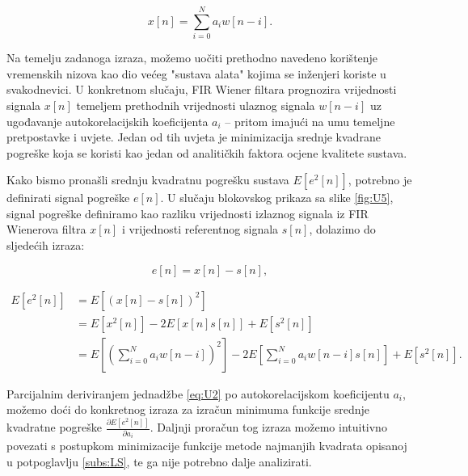 \documentclass[a4paper,12pt,oneside]{memoir}
\begin{document}
            \begin{equation}
                x[n]=\displaystyle\sum_{i=0}^{N}a_i w[n-i].
            \end{equation}

            Na temelju zadanoga izraza, možemo uočiti prethodno navedeno korištenje vremenskih nizova kao dio većeg "sustava alata" kojima se inženjeri koriste u svakodnevici. U konkretnom slučaju, FIR Wiener filtara prognozira vrijednosti signala $x[n]$ temeljem prethodnih vrijednosti ulaznog signala $w[n-i]$ uz ugođavanje autokorelacijskih koeficijenta $a_i$ -- pritom imajući na umu temeljne pretpostavke i uvjete. Jedan od tih uvjeta je minimizacija srednje kvadrane pogreške koja se koristi kao jedan od analitičkih faktora ocjene kvalitete sustava.

            Kako bismo pronašli srednju kvadratnu pogrešku sustava $E[e^2[n]]$, potrebno je definirati signal pogreške $e[n]$. U slučaju blokovskog prikaza sa slike \ref{fig:U5}, signal pogreške definiramo kao razliku vrijednosti izlaznog signala iz FIR Wienerova filtra $x[n]$ i vrijednosti referentnog signala $s[n]$, dolazimo do sljedećih izraza:

            \begin{equation}
                e[n]=x[n]-s[n],
            \end{equation}
        
            \begin{equation}
                \begin{split}
                    E\left[e^2[n]\right]&=E\left[\left(x[n]-s[n]\right)^2\right] \\
                    & = E\left[x^2[n]\right]-2E\left[x[n]s[n]\right]+E\left[s^2[n]\right] \\
                    & = E\left[\left(\displaystyle\sum_{i=0}^{N}a_i w[n-i]\right)^2\right]-2E\left[\displaystyle\sum_{i=0}^{N}a_i w[n-i]s[n]\right]+E\left[s^2[n]\right].
                \end{split}
                \label{eq:U2}
            \end{equation}

            Parcijalnim deriviranjem jednadžbe \ref{eq:U2} po autokorelacijskom koeficijentu $a_i$, možemo doći do konkretnog izraza za izračun minimuma funkcije srednje kvadratne pogreške $\frac{\partial E[e^2[n]]}{\partial a_i}$. Daljnji proračun tog izraza možemo intuitivno povezati s postupkom minimizacije funkcije metode najmanjih kvadrata opisanoj u potpoglavlju \ref{subs:LS}, te ga nije potrebno dalje analizirati.
            
\end{document}
